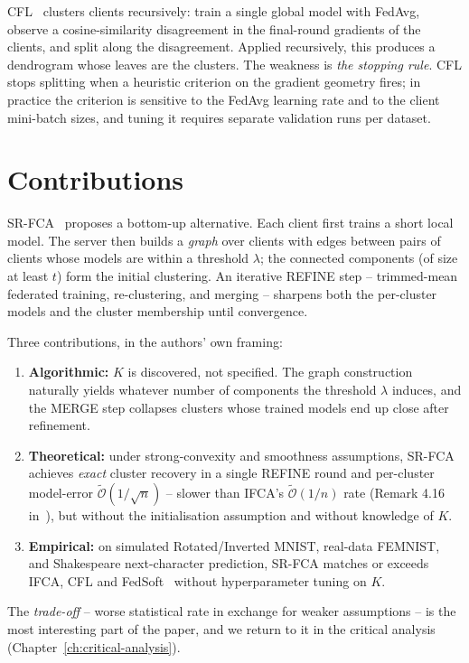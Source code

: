 CFL~\parencite{sattler2021cfl} clusters clients recursively: train a single global model with FedAvg, observe a cosine-similarity disagreement in the final-round gradients of the clients, and split along the disagreement. Applied recursively, this produces a dendrogram whose leaves are the clusters. The weakness is \emph{the stopping rule}. CFL stops splitting when a heuristic criterion on the gradient geometry fires; in practice the criterion is sensitive to the FedAvg learning rate and to the client mini-batch sizes, and tuning it requires separate validation runs per dataset.

\section{Contributions}\label{sec:srfca-contrib}

SR-FCA~\parencite{vardhan2024srfca} proposes a bottom-up alternative. Each client first trains a short local model. The server then builds a \emph{graph} over clients with edges between pairs of clients whose models are within a threshold $\lambda$; the connected components (of size at least $t$) form the initial clustering. An iterative REFINE step -- trimmed-mean federated training, re-clustering, and merging -- sharpens both the per-cluster models and the cluster membership until convergence.

Three contributions, in the authors' own framing:

\begin{enumerate}
    \item \textbf{Algorithmic:} $K$ is discovered, not specified. The graph construction naturally yields whatever number of components the threshold $\lambda$ induces, and the MERGE step collapses clusters whose trained models end up close after refinement.
    \item \textbf{Theoretical:} under strong-convexity and smoothness assumptions, SR-FCA achieves \textit{exact} cluster recovery in a single REFINE round and per-cluster model-error $\tilde{\mathcal{O}}(1/\sqrt{n})$ -- slower than IFCA's $\tilde{\mathcal{O}}(1/n)$ rate (Remark 4.16 in~\parencite{vardhan2024srfca}), but without the initialisation assumption and without knowledge of $K$.
    \item \textbf{Empirical:} on simulated Rotated/Inverted MNIST, real-data FEMNIST, and Shakespeare next-character prediction, SR-FCA matches or exceeds IFCA, CFL and FedSoft~\parencite{ruan2022fedsoft} without hyperparameter tuning on $K$.
\end{enumerate}

The \emph{trade-off} -- worse statistical rate in exchange for weaker assumptions -- is the most interesting part of the paper, and we return to it in the critical analysis (Chapter~\ref{ch:critical-analysis}).